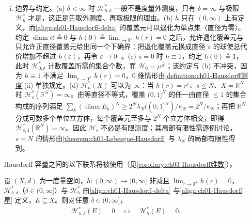 \documentclass[../../main.tex]{subfiles}%
\begin{document}
\begin{remark}
\begin{enumerate}[(i)]
\item 边界与约定。(a) $\delta<\infty$ 时 $\mathcal{H}_{h,\delta}^*$ 一般不是度量外测度，只有 $\delta=\infty$ 与极限 $\mathcal{H}_h^*$ 才是，这正是先取外测度、再取极限的理由。(b) $h$ 只在 $(0,\infty)$ 上有定义，而\eqref{align:ch01-Hausdorff-delta} 的覆盖元可以退化为单点集（直径为零）。约定 $\operatorname{diam}\varnothing\triangleq0$ 与 $h(0)\triangleq\lim_{r\to0^+}h(r)=0$ 之后，允许退化覆盖元与只允许正直径覆盖元给出同一个下确界：把退化覆盖元换成直径 $\varepsilon$ 的球使总代价增加不超过 $h(\varepsilon)$，再令 $\varepsilon\to0^+$。(c) $s=0$ 时 $h\equiv1$，约定 $h(0)\triangleq1$，此时 $\mathcal{H}_{0,\delta}^*$ 计数覆盖所需的集合个数，而 $\mathcal{H}_0=\mu^\#$；该约定与 (b) 不冲突，因为 $h\equiv1$ 不满足 $\lim_{r\to0^+}h(r)=0$，$0$ 维情形由\cref{definition:ch01-Hausdorff测度}(ii) 单独规定。(d) $\mathcal{H}_h^*(X)$ 可以为 $\infty$：当 $h(r)=r^s$、$s\leqslant N$、$X=\mathbb{R}^N$ 时 $\mathcal{H}_s^*(\mathbb{R}^N)=\infty$。由等直径不等式，覆盖 $(0,1]^N$ 的任一由直径 $\leqslant1$ 的集合构成的序列满足 $\sum_k(\operatorname{diam}E_k)^N\geqslant2^N\lambda_N((0,1]^N)/\kappa_N=2^N/\kappa_N$；再把 $\mathbb{R}^N$ 分成可数多个单位立方体，每个覆盖元至多与 $2^N$ 个立方体相交，即得 $\mathcal{H}^*_{s,1}(\mathbb{R}^N)=\infty$。因此 $\mathcal{H}_s$ 不必是有限测度；其局部有限性需逐例讨论，$s=N$ 的情形由\cref{theorem:ch01-Lebesgue-Hausdorff} 与 $\lambda_N$ 的局部有限性得到。
\end{enumerate}
\end{remark}

Hausdorff 容量之间的以下联系将被使用（见\cref{corollary:ch03-Hausdorff维数}）。

\begin{proposition}\label{proposition:ch01-Hausdorff零等价}
设 $(X,d)$ 为一度量空间，$h:(0,\infty)\to(0,\infty]$ 非减且 $\lim_{r\to0^+}h(r)=0$，$\mathcal{H}_{h,\delta}^*$（$\delta\in(0,\infty]$）与 $\mathcal{H}_h^*$ 由\eqref{align:ch01-Hausdorff-delta} 与\eqref{align:ch01-Hausdorff星} 定义，$E\subseteq X$。则对任意 $\delta\in(0,\infty]$，
\begin{align*}
\mathcal{H}_{h,\delta}^*(E)=0\quad\Longleftrightarrow\quad\mathcal{H}_h^*(E)=0 .
\end{align*}
\end{proposition}
\end{document}
